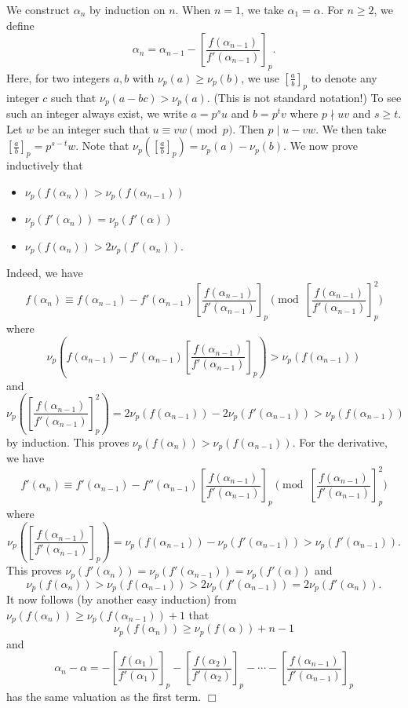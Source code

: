 \documentclass{article}
\begin{document}
We construct $\alpha_n$ by induction on $n$. When $n = 1$, we take $\alpha_1 = \alpha$. For $n\geq 2$, we define $$\alpha_n = \alpha_{n-1} - \left[\frac{f(\alpha_{n-1})}{f'(\alpha_{n-1})}\right]_p.$$
Here, for two integers $a,b$ with $\nu_p(a)\geq\nu_p(b)$, we use $[\frac{a}{b}]_p$ to denote any integer $c$ such that $\nu_p(a - bc) > \nu_p(a).$ (This is not standard notation!) To see such an integer always exist, we write $a = p^su$ and $b = p^tv$ where $p\nmid uv$ and $s\geq t$. Let $w$ be an integer such that $u\equiv vw\pmod{p}$. Then $p\mid u - vw.$ We then take $[\frac{a}{b}]_p = p^{s-t}w$.  Note that $\nu_p([\frac{a}{b}]_p) = \nu_p(a) - \nu_p(b)$. We now prove inductively that
\begin{itemize}
    \item $\nu_p(f(\alpha_n)) > \nu_p(f(\alpha_{n-1}))$
    \item $\nu_p(f'(\alpha_n)) = \nu_p(f'(\alpha))$
    \item $\nu_p(f(\alpha_n))>2\nu_p(f'(\alpha_n))$.
\end{itemize}
Indeed, we have
$$f(\alpha_n) \equiv f(\alpha_{n-1}) - f'(\alpha_{n-1})\left[\frac{f(\alpha_{n-1})}{f'(\alpha_{n-1})}\right]_p\pmod{\left[\frac{f(\alpha_{n-1})}{f'(\alpha_{n-1})}\right]_p^2}$$
where
$$\nu_p\left(f(\alpha_{n-1}) - f'(\alpha_{n-1})\left[\frac{f(\alpha_{n-1})}{f'(\alpha_{n-1})}\right]_p\right) > \nu_p(f(\alpha_{n-1}))$$
and
$$\nu_p\left(\left[\frac{f(\alpha_{n-1})}{f'(\alpha_{n-1})}\right]_p^2\right) = 2\nu_p(f(\alpha_{n-1})) - 2\nu_p(f'(\alpha_{n-1})) > \nu_p(f(\alpha_{n-1}))$$
by induction. This proves $\nu_p(f(\alpha_n)) > \nu_p(f(\alpha_{n-1})).$ For the derivative, we have
$$f'(\alpha_n) \equiv f'(\alpha_{n-1}) - f''(\alpha_{n-1})\left[\frac{f(\alpha_{n-1})}{f'(\alpha_{n-1})}\right]_p\pmod{\left[\frac{f(\alpha_{n-1})}{f'(\alpha_{n-1})}\right]_p^2}$$
where $$\nu_p\left(\left[\frac{f(\alpha_{n-1})}{f'(\alpha_{n-1})}\right]_p\right) = \nu_p(f(\alpha_{n-1})) - \nu_p(f'(\alpha_{n-1})) > \nu_p(f'(\alpha_{n-1})).$$
This proves $\nu_p(f'(\alpha_n)) = \nu_p(f'(\alpha_{n-1})) = \nu_p(f'(\alpha))$ and
$$\nu_p(f(\alpha_n)) > \nu_p(f(\alpha_{n-1})) > 2\nu_p(f'(\alpha_{n-1})) = 2\nu_p(f'(\alpha_n)).$$
It now follows (by another easy induction) from $\nu_p(f(\alpha_n))\geq\nu_p(f(\alpha_{n-1}))+1$ that $$\nu_p(f(\alpha_n))\geq\nu_p(f(\alpha)) + n-1$$
and
$$\alpha_n - \alpha = -\left[\frac{f(\alpha_1)}{f'(\alpha_1)}\right]_p-\left[\frac{f(\alpha_{2})}{f'(\alpha_{2})}\right]_p-\cdots-\left[\frac{f(\alpha_{n-1})}{f'(\alpha_{n-1})}\right]_p$$
has the same valuation as the first term.  $\Box$
\end{document}

